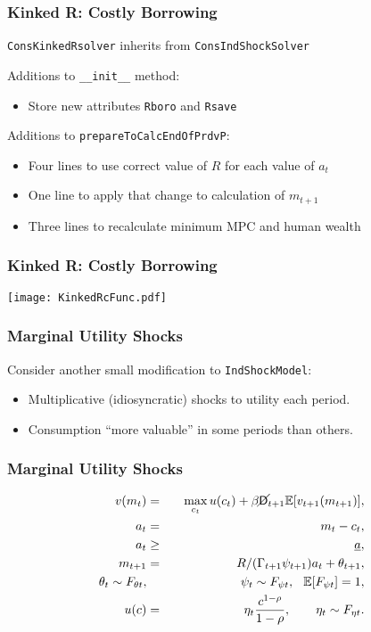 \documentclass[11pt]{cfpbpresentation}
\newcommand{\E}{\mathbb{E}}
\newcommand{\Die}{\mathsf{D}}
\newcommand{\Live}{\cancel{\Die}}
\begin{document}
\begin{frame}
\frametitle{Kinked R: Costly Borrowing}
\texttt{ConsKinkedRsolver} inherits from \texttt{ConsIndShockSolver}

\begin{block}{Additions to \texttt{\_\_init\_\_} method:}
\begin{itemize}
\item Store new attributes \texttt{Rboro} and \texttt{Rsave}
\end{itemize}
\end{block}
\begin{block}{Additions to \texttt{prepareToCalcEndOfPrdvP}:}
\begin{itemize}
\item Four lines to use correct value of $R$ for each value of $a_t$

\item One line to apply that change to calculation of $m_{t+1}$

\item Three lines to recalculate minimum MPC and human wealth
\end{itemize}
\end{block}
\end{frame}


\begin{frame}
\frametitle{Kinked R: Costly Borrowing}
\begin{center}
\texttt{[image: KinkedRcFunc.pdf]}
\end{center}
\end{frame}


\begin{frame}
\frametitle{Marginal Utility Shocks}
Consider another small modification to \texttt{IndShockModel}:
\begin{itemize}
\item Multiplicative (idiosyncratic) shocks to utility each period.

\item Consumption ``more valuable'' in some periods than others.
\end{itemize}
\end{frame}

\begin{frame}
\frametitle{Marginal Utility Shocks}
\begin{eqnarray*}
v(m_t) &=& \max_{c_t} u(c_t) + \beta \Live_{t+1} \E [v_{t+1}(m_{t+1}) ], \\
a_t &=& m_t - c_t, \\
a_t &\geq& \underline{a}, \\
m_{t+1} &=& R/(\Gamma_{t+1} \psi_{t+1}) a_t + \theta_{t+1}, \\
\theta_t \sim F_{\theta t}, &\qquad& \psi_t \sim F_{\psi t}, \hspace{0.25cm} \E[F_{\psi t}] = 1, \\
u(c) &=& \eta_t \frac{c^{1-\rho}}{1-\rho}, \qquad \eta_t \sim F_{\eta t}.
\end{eqnarray*}
\end{frame}
\end{document}
